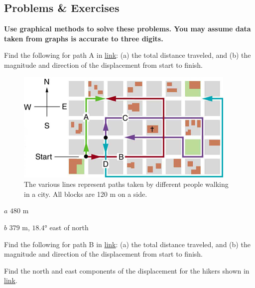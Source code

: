 \documentclass[
]{book}
\newenvironment{problems-exercises}{}{}
\begin{document}
\hypertarget{fs-id1165298586130}{}
\begin{problems-exercises}

\hypertarget{problems-exercises-6}{%
\subsection{Problems \& Exercises}\label{problems-exercises-6}}

\textbf{Use graphical methods to solve these problems. You may assume data
taken from graphs is accurate to three digits.}

\hypertarget{fs-id1165298745593}{}
\leavevmode\hypertarget{fs-id1165296363125}{}%
Find the following for path A in
\protect\hyperlink{import-auto-id1165298872310}{link}: (a) the
total distance traveled, and (b) the magnitude and direction of the
displacement from start to finish.

\begin{figure}
\hypertarget{import-auto-id1165298872310}{%
\centering
\includegraphics{images/Figure_03_02_20a.jpg}
\caption{The various lines represent paths taken by different people walking in
a city. All blocks are 120 m on a
side.}\label{import-auto-id1165298872310}
}
\end{figure}

\leavevmode\hypertarget{fs-id1165296403819}{}%
\(a\) \(\text{480\ m}{}\)

\(b\) \(\text{379\ m}{}\), \(\text{18.4°}{}\) east of north

\hypertarget{fs-id1165298474424}{}
\leavevmode\hypertarget{fs-id1165298770529}{}%
Find the following for path B in
\protect\hyperlink{import-auto-id1165298872310}{link}: (a) the
total distance traveled, and (b) the magnitude and direction of the
displacement from start to finish.

\hypertarget{fs-id1165298867580}{}
\leavevmode\hypertarget{fs-id1165296248676}{}%
Find the north and east components of the displacement for the hikers
shown in \protect\hyperlink{import-auto-id1165298840401}{link}.


\end{problems-exercises}
\end{document}
